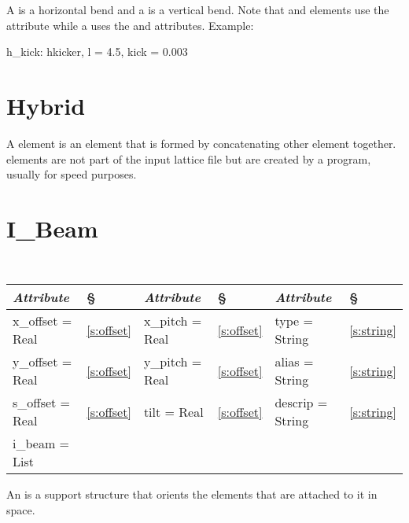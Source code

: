 A  is a horizontal bend and a  is a vertical
bend.  Note that  and  elements use the
 attribute while a  uses the  and  
attributes. Example:
\begin{example}
  h_kick: hkicker, l = 4.5, kick = 0.003
\end{example}

\section{Hybrid}
\label{s:hybrid}

A  element is an element that is formed by concatenating
other element together.  elements are not part of the input
lattice file but are created by a program, usually for speed purposes.

\section{I\_Beam}
\label{s:i_beam}

\begin{center}
\tt
\begin{tabular}{|l|l||l|l||l|l|} \hline
  {\sl Attribute} & \S  & {\sl Attribute} & \S & {\sl Attribute} & \S \\ \hline
  x\_offset  = Real     & \ref{s:offset}  &   x\_pitch  = Real     & \ref{s:offset}  &  type = String    & \ref{s:string}  \\ \hline
  y\_offset  = Real     & \ref{s:offset}  &   y\_pitch  = Real     & \ref{s:offset}  &  alias = String   & \ref{s:string}  \\ \hline
  s\_offset  = Real     & \ref{s:offset}  &   tilt      = Real     & \ref{s:offset}  &  descrip = String & \ref{s:string}  \\ \hline
  i\_beam = List        &                 &                        &                 &                   &                 \\ \hline
\end{tabular}
\end{center}
\toffset

An  is a support structure that orients the elements that
are attached to it in space.

